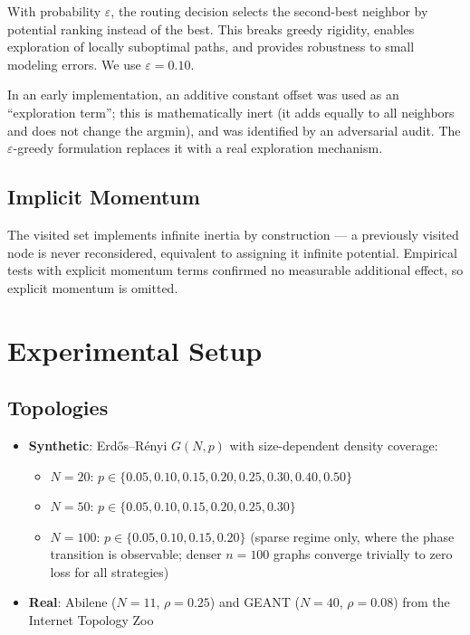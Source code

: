 \documentclass[11pt,a4paper]{article}
\begin{document}
With probability $\varepsilon$, the routing decision selects the
second-best neighbor by potential ranking instead of the best. This
breaks greedy rigidity, enables exploration of locally suboptimal
paths, and provides robustness to small modeling errors. We use
$\varepsilon = 0.10$.

In an early implementation, an additive constant offset was used as an
``exploration term''; this is mathematically inert (it adds equally to
all neighbors and does not change the argmin), and was identified by
an adversarial audit. The $\varepsilon$-greedy formulation replaces
it with a real exploration mechanism.

\subsection{Implicit Momentum}

The visited set implements infinite inertia by construction --- a
previously visited node is never reconsidered, equivalent to assigning
it infinite potential. Empirical tests with explicit momentum terms
confirmed no measurable additional effect, so explicit momentum is
omitted.

\section{Experimental Setup}

\subsection{Topologies}

\begin{itemize}[itemsep=1pt]
  \item \textbf{Synthetic}: Erd\H{o}s--R\'enyi $G(N, p)$ with
        size-dependent density coverage:
    \begin{itemize}[itemsep=1pt]
      \item $N = 20$: $p \in \{0.05, 0.10, 0.15, 0.20, 0.25, 0.30, 0.40, 0.50\}$
      \item $N = 50$: $p \in \{0.05, 0.10, 0.15, 0.20, 0.25, 0.30\}$
      \item $N = 100$: $p \in \{0.05, 0.10, 0.15, 0.20\}$ (sparse
            regime only, where the phase transition is observable;
            denser $n{=}100$ graphs converge trivially to zero loss
            for all strategies)
    \end{itemize}
  \item \textbf{Real}: Abilene ($N = 11$, $\rho = 0.25$) and GEANT
        ($N = 40$, $\rho = 0.08$) from the Internet Topology
        Zoo~\cite{knight2011}
\end{itemize}
\end{document}
